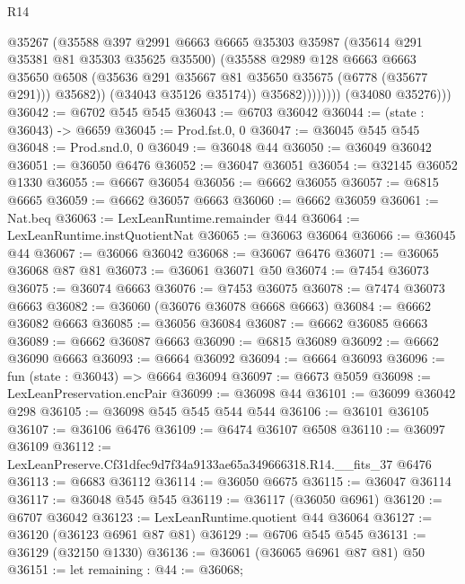 \begin{lexlean}{R14}
\begin{coremodule}
                          @35267
                          (@35588
                            @397
                            @2991
                            @6663
                            @6665
                            @35303
                            @35987
                            (@35614 @291 @35381 @81 @35303 @35625 @35500)
                            (@35588
                              @2989
                              @128
                              @6663
                              @6663
                              @35650
                              @6508
                              (@35636 @291 @35667 @81 @35650 @35675 (@6778 (@35677 @291)))
                              @35682))
                          (@34043 @35126 @35174))
                        @35682))))))))
        (@34080 @35276)))
@36042 := @6702 @545 @545
@36043 := @6703 @36042
@36044 := (state : @36043) -> @6659
@36045 := Prod.fst.{0, 0}
@36047 := @36045 @545 @545
@36048 := Prod.snd.{0, 0}
@36049 := @36048 @44
@36050 := @36049 @36042
@36051 := @36050 @6476
@36052 := @36047 @36051
@36054 := @32145 @36052 @1330
@36055 := @6667 @36054
@36056 := @6662 @36055
@36057 := @6815 @6665
@36059 := @6662 @36057 @6663
@36060 := @6662 @36059
@36061 := Nat.beq
@36063 := LexLeanRuntime.remainder @44
@36064 := LexLeanRuntime.instQuotientNat
@36065 := @36063 @36064
@36066 := @36045 @44
@36067 := @36066 @36042
@36068 := @36067 @6476
@36071 := @36065 @36068 @87 @81
@36073 := @36061 @36071 @50
@36074 := @7454 @36073
@36075 := @36074 @6663
@36076 := @7453 @36075
@36078 := @7474 @36073 @6663
@36082 := @36060 (@36076 @36078 @6668 @6663)
@36084 := @6662 @36082 @6663
@36085 := @36056 @36084
@36087 := @6662 @36085 @6663
@36089 := @6662 @36087 @6663
@36090 := @6815 @36089
@36092 := @6662 @36090 @6663
@36093 := @6664 @36092
@36094 := @6664 @36093
@36096 := fun (state : @36043) => @6664 @36094
@36097 := @6673 @5059
@36098 := LexLeanPreservation.encPair
@36099 := @36098 @44
@36101 := @36099 @36042 @298
@36105 := @36098 @545 @545 @544 @544
@36106 := @36101 @36105
@36107 := @36106 @6476
@36109 := @6474 @36107 @6508
@36110 := @36097 @36109
@36112 := LexLeanPreserve.Cf31dfec9d7f34a9133ae65a349666318.R14.__fits_37 @6476
@36113 := @6683 @36112
@36114 := @36050 @6675
@36115 := @36047 @36114
@36117 := @36048 @545 @545
@36119 := @36117 (@36050 @6961)
@36120 := @6707 @36042
@36123 := LexLeanRuntime.quotient @44 @36064
@36127 := @36120 (@36123 @6961 @87 @81)
@36129 := @6706 @545 @545
@36131 := @36129 (@32150 @1330)
@36136 := @36061 (@36065 @6961 @87 @81) @50
@36151 := let remaining : @44 := @36068;

\end{coremodule}
\end{lexlean}
